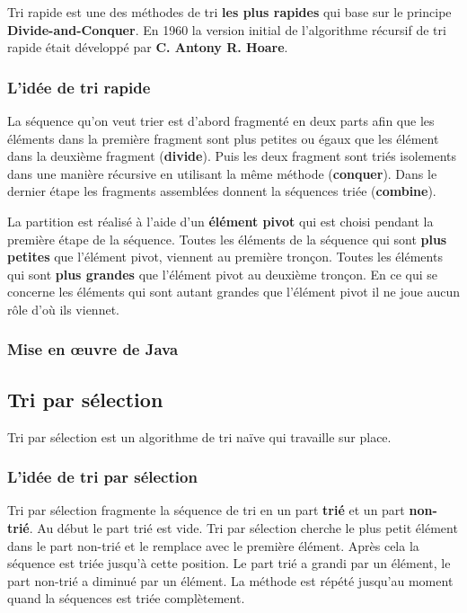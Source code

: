 \documentclass[11pt, a4paper, titlepage, twoside]{article}
\renewcommand{\emph}{\textbf}
\begin{document}
	Tri rapide est une des méthodes de tri \emph{les plus rapides} qui base sur le principe \emph{Divide-and-Conquer}. En 1960 la version initial de l'algorithme récursif de tri rapide était développé par \emph{C. Antony R. Hoare}.
	
	\subsubsection{L'idée de tri rapide}
	
	La séquence qu'on veut trier est d'abord fragmenté en deux parts afin que les éléments dans la première fragment sont plus petites ou égaux que les élément dans la deuxième fragment (\emph{divide}). Puis les deux fragment sont triés isolements dans une manière récursive en utilisant la même méthode (\emph{conquer}). Dans le dernier étape les fragments assemblées donnent la séquences triée (\emph{combine}).
	
	La partition est réalisé  à l'aide d'un \emph{élément pivot} qui est choisi pendant la première étape de la séquence. Toutes les éléments de la séquence qui sont \emph{plus petites} que l'élément pivot, viennent au première tronçon. Toutes les éléments qui sont \emph{plus grandes} que l'élément pivot au deuxième tronçon. En ce qui se concerne les éléments qui sont autant grandes que l'élément pivot il ne joue aucun rôle d'où ils viennet.
	
	\subsubsection{Mise en œuvre de Java}
	
	
	
	\subsection{Tri par sélection}
	
	Tri par sélection est un algorithme de tri naïve qui travaille sur place.
	
	\subsubsection{L'idée de tri par sélection}
	
	Tri par sélection fragmente la séquence de tri en un part \emph{trié} et un part \emph{non-trié}. Au début le part trié est vide. Tri par sélection cherche le plus petit élément dans le part non-trié et le remplace avec le première élément. Après cela la séquence est triée jusqu'à cette position. Le part trié a grandi par un élément, le part non-trié a diminué par un élément. La méthode est répété jusqu'au moment quand la séquences est triée complètement.
	
\end{document}
